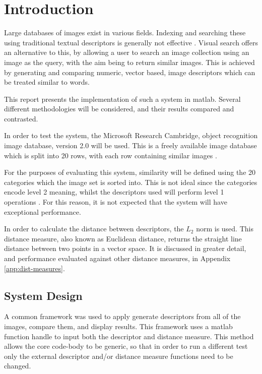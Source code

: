 \chapter{Introduction} \label{sec:intro}

Large databases of images exist in various fields. Indexing and searching these using traditional textual descriptors is generally not effective \cite[p.657]{forsyth2012}. Visual search offers an alternative to this, by allowing a user to search an image collection using an image as the query, with the aim being to return similar images. This is achieved by generating and comparing numeric, vector based, image descriptors which can be treated similar to words.

This report presents the implementation of such a system in \gls{matlab}. Several different methodologies will be considered, and their results compared and contrasted.

In order to test the system, the Microsoft Research Cambridge, object recognition image database, version 2.0 will be used. This is a freely available image database which is split into 20 rows, with each row containing similar images \cite{criminisi2004}.

For the purposes of evaluating this system, similarity will be defined using the 20 categories which the image set is sorted into. This is not ideal since the categories encode level 2 meaning, whilst the descriptors used will perform level 1 operations \cite{eakins1998}. For this reason, it is not expected that the system will have exceptional performance.

In order to calculate the distance between descriptors, the $L_2$ norm is used. This distance measure, also known as Euclidean distance, returns the straight line distance between two points in a vector space. It is discussed in greater detail, and performance evaluated against other distance measures, in Appendix \ref{app:dist-measures}. 

\section{System Design} \label{sec:sys-design}
A common framework was used to apply generate descriptors from all of the images, compare them, and display results. This framework uses a \gls{matlab} function handle to input both the descriptor and distance measure. This method allows the core code-body to be generic, so that in order to run a different test only the external descriptor and/or distance measure functions need to be changed.

